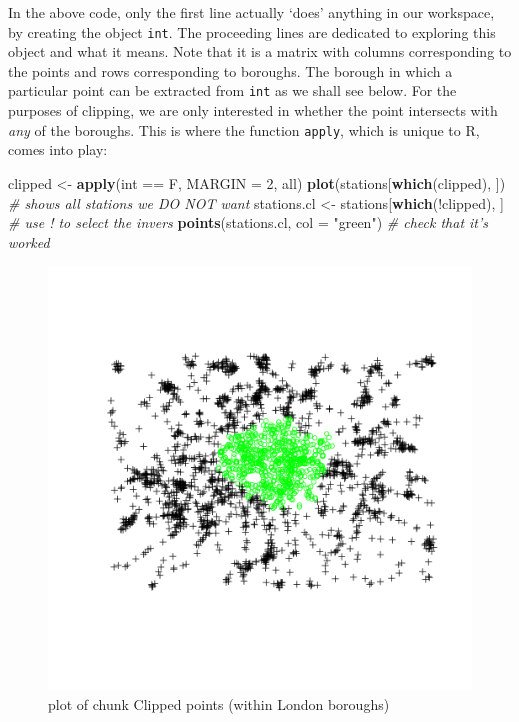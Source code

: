 \documentclass[]{article}
\makeatletter
\newenvironment{Shaded}{}{}
\newcommand{\KeywordTok}[1]{\textcolor[rgb]{0.00,0.44,0.13}{\textbf{{#1}}}}
\newcommand{\DataTypeTok}[1]{\textcolor[rgb]{0.56,0.13,0.00}{{#1}}}
\newcommand{\DecValTok}[1]{\textcolor[rgb]{0.25,0.63,0.44}{{#1}}}
\newcommand{\StringTok}[1]{\textcolor[rgb]{0.25,0.44,0.63}{{#1}}}
\newcommand{\CommentTok}[1]{\textcolor[rgb]{0.38,0.63,0.69}{\textit{{#1}}}}
\newcommand{\NormalTok}[1]{{#1}}
\def\maxwidth{\ifdim\Gin@nat@width>\linewidth\linewidth
\else\Gin@nat@width\fi}
\let\Oldincludegraphics\includegraphics
\renewcommand{\includegraphics}[1]{\Oldincludegraphics[width=\maxwidth]{#1}}
\makeatother
\begin{document}
In the above code, only the first line actually `does' anything in our
workspace, by creating the object \texttt{int}. The proceeding lines are
dedicated to exploring this object and what it means. Note that it is a
matrix with columns corresponding to the points and rows corresponding
to boroughs. The borough in which a particular point can be extracted
from \texttt{int} as we shall see below. For the purposes of clipping,
we are only interested in whether the point intersects with \emph{any}
of the boroughs. This is where the function \texttt{apply}, which is
unique to R, comes into play:

\begin{Shaded}
\begin{Highlighting}[]
\NormalTok{clipped <- }\KeywordTok{apply}\NormalTok{(int == F, }\DataTypeTok{MARGIN =} \DecValTok{2}\NormalTok{, all)}
\KeywordTok{plot}\NormalTok{(stations[}\KeywordTok{which}\NormalTok{(clipped), ])  }\CommentTok{# shows all stations we DO NOT want}
\NormalTok{stations.cl <- stations[}\KeywordTok{which}\NormalTok{(!clipped), ]  }\CommentTok{# use ! to select the invers}
\KeywordTok{points}\NormalTok{(stations.cl, }\DataTypeTok{col =} \StringTok{"green"}\NormalTok{)  }\CommentTok{# check that it's worked}
\end{Highlighting}
\end{Shaded}
\begin{figure}[htbp]
\centering
\includegraphics{figure/Clipped_points__within_London_boroughs_.png}
\caption{plot of chunk Clipped points (within London boroughs)}
\end{figure}
\end{document}
